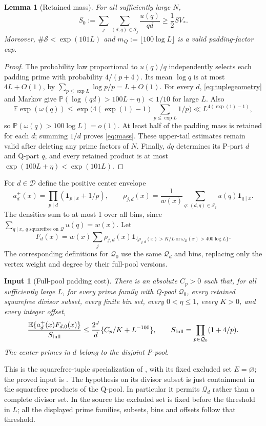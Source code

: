 \documentclass[11pt]{article}
\newtheorem{lemma}[theorem]{Lemma}
\newtheorem{inputthm}[theorem]{Input}
\theoremstyle{definition}
\newcommand{\E}{\mathbb E}
\newcommand{\Prob}{\mathbb P}
\newcommand{\ind}{\mathbf 1}
\begin{document}
\begin{lemma}[Retained mass]\label{lem:mass}
For all sufficiently large $N$,
\begin{equation}\label{eq:mass}
 S_0:=\sum_j\sum_{(d,q)\in\mathcal S_j}\frac{u(q)}{qd}
 \ge\frac12SV_*.
\end{equation}
Moreover, $\#\mathcal S<\exp(101L)$ and
$m_Q:=\lfloor100\log L\rfloor$ is a valid padding-factor cap.
\end{lemma}
\begin{proof}
The probability law proportional to $u(q)/q$ independently selects each
padding prime with probability $4/(p+4)$.
Its mean $\log q$ is at most $4L+O(1)$, by
$\sum_{p\le\exp L}\log p/p=L+O(1)$.
For every $d$, \eqref{eq:tuplegeometry} and Markov give
$\Prob(\log(qd)>100L+\eta)<1/10$ for large $L$.
Also
\[
 \E\exp(\omega(q))
 \le\exp\bigl(4(\exp(1)-1)\sum_{p\le\exp L}1/p\bigr)
 \ll L^{4(\exp(1)-1)},
\]
so $\Prob(\omega(q)>100\log L)=o(1)$.
At least half of the padding mass is retained for each $d$; summing
$1/d$ proves \eqref{eq:mass}. These upper-tail estimates remain valid
after deleting any prime factors of $N$.
Finally, $dq$ determines its P-part $d$ and Q-part $q$, and every retained
product is at most $\exp(100L+\eta)<\exp(101L)$.
\end{proof}

For $d\in\mathcal D$ define the positive center envelope
\[
 a_d^+(x)=\prod_{p\mid d}(\ind_{p\mid x}+1/p),\qquad
 \rho_{j,d}(x)=\frac1{w(x)}
       \sum_{q:\,(d,q)\in\mathcal S_j}u(q)\ind_{q\mid x}.
\]
The densities sum to at most 1 over all bins, since
$\sum_{q\mid x,\ q\text{ squarefree on }\mathcal Q}u(q)=w(x)$.
Let
\[
 F_d(x)=w(x)\sum_j\rho_{j,d}(x)
      \ind_{\{\rho_{j,d}(x)>K/L\ \text{or}\
                         \omega_{\mathcal Q}(x)>400\log L\}}.
\]
The corresponding definitions for $\mathcal Q_0$ use the same
$\mathcal Q_d$ and bins, replacing only the vertex weight and degree
by their full-pool versions.

\begin{inputthm}[Full-pool padding cost]\label{input:paddingcost}
There is an absolute $C_p>0$ such that, for all sufficiently large $L$,
for every prime family with Q-pool $\mathcal Q_0$, every retained
squarefree divisor subset, every finite bin set, every
$0<\eta\le1$, every $K>0$, and every integer offset,
\begin{equation}\label{eq:fullpadding}
 \frac{\E\{a_d^+(x)F_{d,0}(x)\}}{S_{\rm full}}
 \le\frac{2^J}{d}\{C_p/K+L^{-100}\},
 \qquad S_{\rm full}=\prod_{p\in\mathcal Q_0}(1+4/p).
\end{equation}
The center primes in $d$ belong to the disjoint P-pool.
\end{inputthm}
This is the squarefree-tuple specialization of
, with
its fixed excluded set $E=\varnothing$; the proved input is
.
The hypothesis on its divisor subset is just containment in the
squarefree products of the Q-pool. In particular it permits
$\mathcal Q_d$ rather than a complete divisor set.
In the source the excluded set is fixed before the threshold in $L$;
all the displayed prime families, subsets, bins and offsets follow
that threshold.
\end{document}
